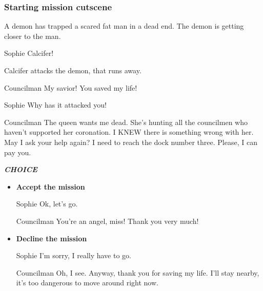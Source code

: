 \subsubsection*{Starting mission cutscene}
\begin{screenplay}

A demon has trapped a scared fat man in a dead end. The demon is getting closer to the man.

\begin{dialogue}{Sophie}
Calcifer!
\end{dialogue}

Calcifer attacks the demon, that runs away.

\begin{dialogue}[grateful]{Councilman}
My savior! You saved my life!
\end{dialogue}

\begin{dialogue}{Sophie}
Why has it attacked you!
\end{dialogue}

\begin{dialogue}{Councilman}
The queen wants me dead. She's hunting all the councilmen who haven't supported her coronation. I KNEW there is something wrong with her. May I ask your help again? I need to reach the dock number three. Please, I can pay you.
\end{dialogue}

\end{screenplay}

\textit{\textbf{CHOICE}}
\begin{itemize}
\item \textbf{Accept the mission}

\begin{screenplay}

\begin{dialogue}{Sophie}
Ok, let's go.
\end{dialogue}

\begin{dialogue}[grateful]{Councilman}
You're an angel, miss! Thank you very much!
\end{dialogue}

\end{screenplay}

\item \textbf{Decline the mission}

\begin{screenplay}

\begin{dialogue}{Sophie}
I'm sorry, I really have to go.
\end{dialogue}

\begin{dialogue}[disappointed]{Councilman}
Oh, I see. Anyway, thank you for saving my life. I'll stay nearby, it's too dangerous to move around right now.
\end{dialogue}

\end{screenplay}

\end{itemize}

